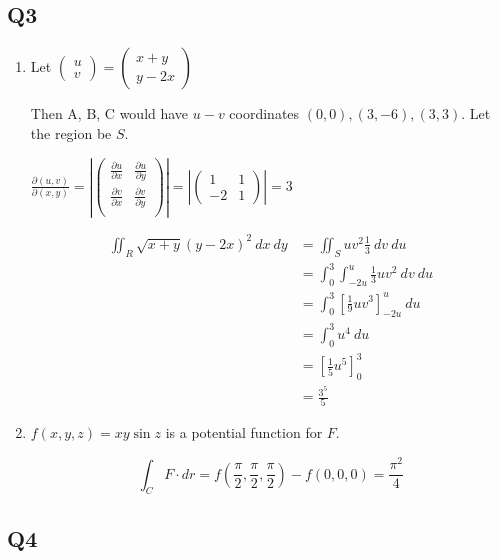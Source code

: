 \documentclass{article}
\newcommand{\p}[2]{\frac{\partial #1}{\partial #2}}
\newcommand{\abs}[1]{\left| #1 \right|}
\newcommand{\paren}[1]{\left(#1\right)}
\newcommand{\brac}[1]{\left[#1\right]}
\begin{document}
\subsection*{Q3}
\begin{enumerate}[label=(\alph*)]
\item
Let $
\begin{pmatrix}
u\\v
\end{pmatrix}
= \begin{pmatrix}
x+y\\y-2x
\end{pmatrix}
$

Then A, B, C would have $u-v$ coordinates $(0,0),(3,-6),(3,3)$. Let the region be $S$.

$
\p{(u,v)}{(x,y)} = \abs{\begin{pmatrix}
\p{u}{x} & \p{u}{y} \\
\p{v}{x} & \p{v}{y} \\
\end{pmatrix}} = \abs{\begin{pmatrix}
1 & 1\\
-2 & 1
\end{pmatrix}} = 3
$

\begin{align*}
\iint_R \sqrt{x+y} (y-2x)^2\ dx\ dy &= \iint_S uv^2 \frac{1}{3}\ dv\ du \\
&= \int_0^3 \int_{-2u}^u \frac{1}{3} uv^2\ dv\ du \\
&= \int_0^3 \brac{\frac{1}{9}uv^3}_{-2u}^u\ du \\
&= \int_0^3 u^4\ du \\
&= \brac{\frac{1}{5}u^5}_0^3 \\
&= \frac{3^5}{5}
\end{align*}

\item
$f(x,y,z) = xy\sin z$ is a potential function for $F$.

\[
\int_C F\cdot dr = f\paren{\frac{\pi}{2},\frac{\pi}{2},\frac{\pi}{2}} - f(0,0,0) = \frac{\pi^2}{4}
\]

\end{enumerate}

\subsection*{Q4}
\end{document}
